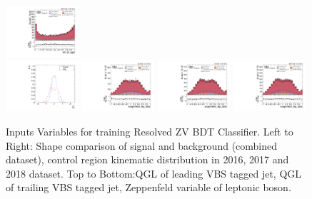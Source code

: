 \begin{figure}[!ht]
  \includegraphics[width=0.24\textwidth]{analysis_plots/2018_zjj/cr_vjets_l/vbf_j2_qgid.pdf} \\
  \includegraphics[width=0.24\textwidth]{analysis_plots/tmva_plots/zjj_BDTG14_zeppLep_deta.pdf}
  \includegraphics[width=0.24\textwidth]{analysis_plots/2016_zjj/cr_vjets_l/zeppenfeld_lep_deta.pdf}
  \includegraphics[width=0.24\textwidth]{analysis_plots/2017_zjj/cr_vjets_l/zeppenfeld_lep_deta.pdf}
  \includegraphics[width=0.24\textwidth]{analysis_plots/2018_zjj/cr_vjets_l/zeppenfeld_lep_deta.pdf}
  \caption[Inputs Variables for training Resolved ZV BDT Classifier]%
  {Inputs Variables for training Resolved ZV BDT Classifier.
    Left to Right: Shape comparison of signal and background (combined dataset), control region
    kinematic distribution in 2016, 2017 and 2018 dataset.
    Top to Bottom:\gls{QGL} of leading VBS tagged jet,
    \gls{QGL} of trailing VBS tagged jet, Zeppenfeld variable of leptonic boson.}%
  \label{fig:vbs-training-input-zjj-1}
\end{figure}



